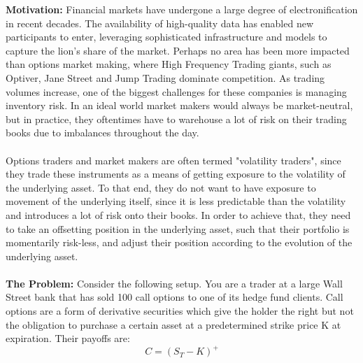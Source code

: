\documentclass{article}
\begin{document}
\textbf{Motivation:} Financial markets have undergone a large degree of electronification in recent decades. The availability of high-quality data has enabled new participants to enter, leveraging sophisticated infrastructure and models to capture the lion's share of the market. Perhaps no area has been more impacted than options market making, where High Frequency Trading giants, such as Optiver, Jane Street and Jump Trading dominate competition. As trading volumes increase, one of the biggest challenges for these companies is managing inventory risk. In an ideal world market makers would always be market-neutral, but in practice, they oftentimes have to warehouse a lot of risk on their trading books due to imbalances throughout the day.\\\\
Options traders and market makers are often termed "volatility traders", since they trade these instruments as a means of getting exposure to the volatility of the underlying asset. To that end, they do not want to have exposure to movement of the underlying itself, since it is less predictable than the volatility and introduces a lot of risk onto their books. In order to achieve that, they need to take an offsetting position in the underlying asset, such that their portfolio is momentarily risk-less, and adjust their position according to the evolution of the underlying asset.\\\\
\textbf{The Problem:}
Consider the following setup. You are a trader at a large Wall Street bank that has sold 100 call options to one of its hedge fund clients. Call options are a form of derivative securities which give the holder the right but not the obligation to purchase a certain asset at a predetermined strike price K at expiration. Their payoffs are:
\begin{equation}
    C = (S_T-K)^+
\end{equation}
\end{document}
